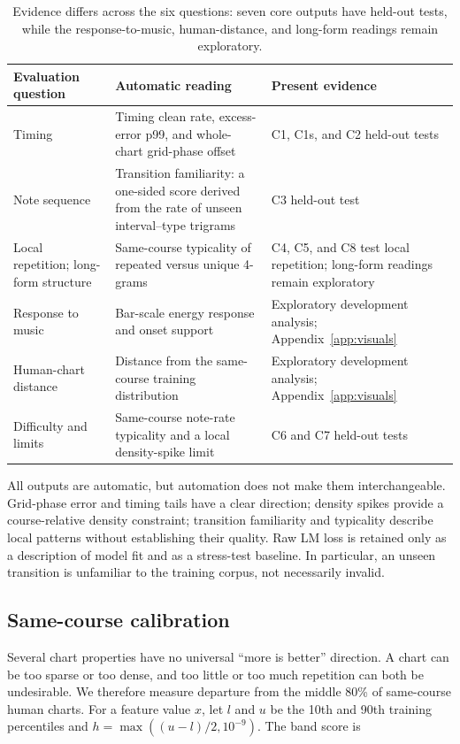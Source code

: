 \documentclass[10pt,twocolumn]{article}
\begin{document}
\begin{table}[t]
\centering
\footnotesize
\setlength{\tabcolsep}{6pt}
\renewcommand{\arraystretch}{1.15}
\begin{tabular}{@{}p{}p{}p{}@{}}
\toprule
Evaluation question & Automatic reading & Present evidence \\
\midrule
Timing & Timing clean rate, excess-error p99, and whole-chart grid-phase offset & C1, C1s, and C2 held-out tests \\
Note sequence & Transition familiarity: a one-sided score derived from the rate of unseen interval--type trigrams & C3 held-out test \\
Local repetition; long-form structure & Same-course typicality of repeated versus unique 4-grams & C4, C5, and C8 test local repetition; long-form readings remain exploratory \\
Response to music & Bar-scale energy response and onset support & Exploratory development analysis; Appendix~\ref{app:visuals} \\
Human-chart distance & Distance from the same-course training distribution & Exploratory development analysis; Appendix~\ref{app:visuals} \\
Difficulty and limits & Same-course note-rate typicality and a local density-spike limit & C6 and C7 held-out tests \\
\bottomrule
\end{tabular}
\caption{Evidence differs across the six questions: seven core outputs have
held-out tests, while the response-to-music, human-distance, and long-form
readings remain exploratory.}
\label{tab:suite}
\end{table}

All outputs are automatic, but automation does not make them
interchangeable. Grid-phase error and timing tails have a clear direction;
density spikes provide a course-relative density constraint; transition familiarity and
typicality describe local patterns without establishing their quality. Raw LM loss is
retained only as a description of model fit and as a stress-test baseline.
In particular, an unseen transition is unfamiliar to the training corpus,
not necessarily invalid.

\subsection{Same-course calibration}\label{sec:layers}

Several chart properties have no universal ``more is better'' direction. A
chart can be too sparse or too dense, and too little or too much repetition
can both be undesirable. We therefore measure departure from the middle 80\%
of same-course human charts. For a feature value $x$, let $l$ and $u$ be the
10th and 90th training percentiles and
$h=\max((u-l)/2,10^{-9})$. The band score is
\end{document}
